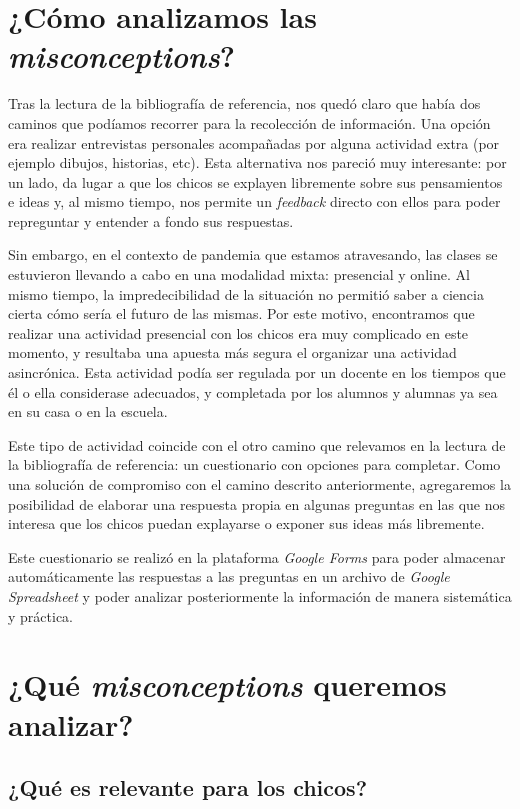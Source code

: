 \section{¿Cómo analizamos las \textit{misconceptions}?}

Tras la lectura de la bibliografía de referencia, nos quedó claro que había dos caminos que podíamos recorrer para la recolección de información. Una opción era realizar entrevistas personales acompañadas por alguna actividad extra (por ejemplo dibujos, historias, etc). Esta alternativa nos pareció muy interesante: por un lado, da lugar a que los chicos se explayen libremente sobre sus pensamientos e ideas y, al mismo tiempo, nos permite un \textit{feedback} directo con ellos para poder repreguntar y entender a fondo sus respuestas.

Sin embargo, en el contexto de pandemia que estamos atravesando, las clases se estuvieron llevando a cabo en una modalidad mixta: presencial y online. Al mismo tiempo, la impredecibilidad de la situación no permitió saber a ciencia cierta cómo sería el futuro de las mismas. Por este motivo, encontramos que realizar una actividad presencial con los chicos era muy complicado en este momento, y resultaba una apuesta más segura el organizar una actividad asincrónica. Esta actividad podía ser regulada por un docente en los tiempos que él o ella considerase adecuados, y completada por los alumnos y alumnas ya sea en su casa o en la escuela.

Este tipo de actividad coincide con el otro camino que relevamos en la lectura de la bibliografía de referencia: un cuestionario con opciones para completar. Como una solución de compromiso con el camino descrito anteriormente, agregaremos la posibilidad de elaborar una respuesta propia en algunas preguntas en las que nos interesa que los chicos puedan explayarse o exponer sus ideas más libremente.

Este cuestionario se realizó en la plataforma \textit{Google Forms} para poder almacenar automáticamente las respuestas a las preguntas en un archivo de \textit{Google Spreadsheet} y poder analizar posteriormente la información de manera sistemática y práctica.

\section{¿Qué \textit{misconceptions} queremos analizar?}
\subsection{¿Qué es relevante para los chicos?}


